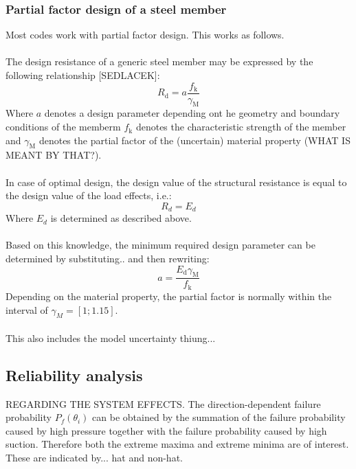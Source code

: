 \subsubsection{Partial factor design of a steel member}
Most codes work with partial factor design. This works as follows.\\ 
\\
The design resistance of a generic steel member may be expressed by the following relationship [SEDLACEK]:
\begin{equation}
R_{\mathrm{d}} = a\frac{f_{\mathrm{k}}}{\gamma_{\mathrm{M}}}
\end{equation}
Where $a$ denotes a design parameter depending ont he geometry and boundary conditions of the memberm $f_{\mathrm{k}}$ denotes the characteristic strength of the member and $\gamma_{\mathrm{M}}$ denotes the partial factor of the (uncertain) material property (WHAT IS MEANT BY THAT?). \\
\\
In case of optimal design, the design value of the structural resistance is equal to the design value of the load effects, i.e.:
\begin{equation}
R_d = E_d
\end{equation}
Where $E_d$ is determined as described above. \\
\\
Based on this knowledge, the minimum required design parameter can be determined by substituting.. and then rewriting:
\begin{equation}
a = \frac{ E_{\mathrm{d}} \gamma_{\mathrm{M}}} {f_{\mathrm{k}}} 
\end{equation}
Depending on the material property, the partial factor is normally within the interval of $\gamma_{M}=[1; 1.15]$.\\ 
\\
This also includes the model uncertainty thiung... 


\subsection{Reliability analysis}

REGARDING THE SYSTEM EFFECTS. 
The direction-dependent failure probability $P_f(\theta_i)$ can be obtained by the summation of the failure probability caused by high pressure together with the failure probability caused by high suction. Therefore both the extreme maxima and extreme minima are of interest. These are indicated by... hat and non-hat.


